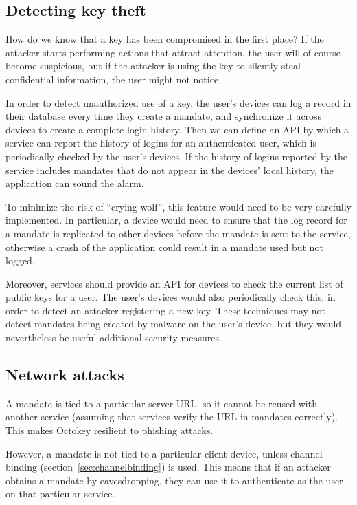 \subsection{Detecting key theft}

How do we know that a key has been compromised in the first place? If the attacker starts performing
actions that attract attention, the user will of course become suspicious, but if the attacker is
using the key to silently steal confidential information, the user might not notice.

In order to detect unauthorized use of a key, the user's devices can log a record in their database
every time they create a mandate, and synchronize it across devices to create a complete login
history. Then we can define an API by which a service can report the history of logins for an
authenticated user, which is periodically checked by the user's devices. If the history of logins
reported by the service includes mandates that do not appear in the devices' local history, the
application can sound the alarm.

To minimize the risk of ``crying wolf'', this feature would need to be very carefully implemented.
In particular, a device would need to ensure that the log record for a mandate is replicated to
other devices before the mandate is sent to the service, otherwise a crash of the application could
result in a mandate used but not logged.

Moreover, services should provide an API for devices to check the current list of public keys for a
user. The user's devices would also periodically check this, in order to detect an attacker
registering a new key. These techniques may not detect mandates being created by malware on the
user's device, but they would nevertheless be useful additional security measures.

\subsection{Network attacks}\label{sec:netattack}

A mandate is tied to a particular server URL, so it cannot be reused with another service (assuming
that services verify the URL in mandates correctly). This makes Octokey resilient to phishing
attacks.

However, a mandate is not tied to a particular client device, unless channel binding
(section~\ref{sec:channelbinding}) is used. This means that if an attacker obtains a mandate by
eavesdropping, they can use it to authenticate as the user on that particular service.

